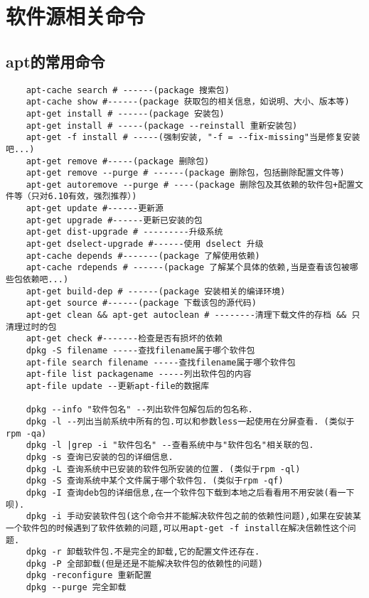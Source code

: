 \documentclass[a4paper,left=1.5cm,right=1.5cm,11pt]{article}
\begin{document}
\tableofcontents

\clearpage


\section{软件源相关命令}

\subsection{apt的常用命令}
\begin{lstlisting}
	apt-cache search # ------(package 搜索包)
	apt-cache show #------(package 获取包的相关信息，如说明、大小、版本等)
	apt-get install # ------(package 安装包)
	apt-get install # -----(package --reinstall 重新安装包)
	apt-get -f install # -----(强制安装, "-f = --fix-missing"当是修复安装吧...)
	apt-get remove #-----(package 删除包)
	apt-get remove --purge # ------(package 删除包，包括删除配置文件等)
	apt-get autoremove --purge # ----(package 删除包及其依赖的软件包+配置文件等（只对6.10有效，强烈推荐）)
	apt-get update #------更新源
	apt-get upgrade #------更新已安装的包
	apt-get dist-upgrade # ---------升级系统
	apt-get dselect-upgrade #------使用 dselect 升级
	apt-cache depends #-------(package 了解使用依赖)
	apt-cache rdepends # ------(package 了解某个具体的依赖,当是查看该包被哪些包依赖吧...)
	apt-get build-dep # ------(package 安装相关的编译环境)
	apt-get source #------(package 下载该包的源代码)
	apt-get clean && apt-get autoclean # --------清理下载文件的存档 && 只清理过时的包
	apt-get check #-------检查是否有损坏的依赖
	dpkg -S filename -----查找filename属于哪个软件包
	apt-file search filename -----查找filename属于哪个软件包
	apt-file list packagename -----列出软件包的内容
	apt-file update --更新apt-file的数据库

	dpkg --info "软件包名" --列出软件包解包后的包名称.
	dpkg -l --列出当前系统中所有的包.可以和参数less一起使用在分屏查看. (类似于rpm -qa)
	dpkg -l |grep -i "软件包名" --查看系统中与"软件包名"相关联的包.
	dpkg -s 查询已安装的包的详细信息.
	dpkg -L 查询系统中已安装的软件包所安装的位置. (类似于rpm -ql)
	dpkg -S 查询系统中某个文件属于哪个软件包. (类似于rpm -qf)
	dpkg -I 查询deb包的详细信息,在一个软件包下载到本地之后看看用不用安装(看一下呗).
	dpkg -i 手动安装软件包(这个命令并不能解决软件包之前的依赖性问题),如果在安装某一个软件包的时候遇到了软件依赖的问题,可以用apt-get -f install在解决信赖性这个问题.
	dpkg -r 卸载软件包.不是完全的卸载,它的配置文件还存在.
	dpkg -P 全部卸载(但是还是不能解决软件包的依赖性的问题)
	dpkg -reconfigure 重新配置
	dpkg --purge 完全卸载
\end{lstlisting}
\end{document}
